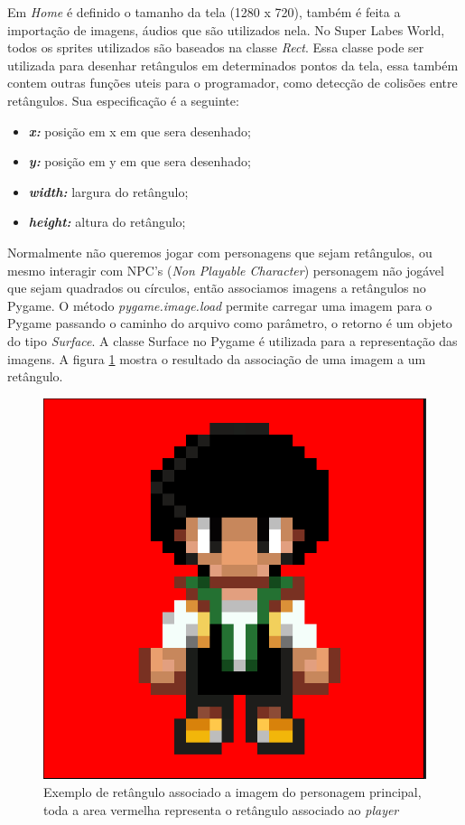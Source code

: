 
\clearpage
Em \textit{Home} é definido o tamanho da tela (1280 x 720), também é feita a importação de imagens, áudios que são utilizados nela.
No Super Labes World, todos os sprites utilizados são  baseados na classe \textit{Rect}. Essa classe pode ser utilizada para desenhar retângulos em determinados pontos da tela, essa também contem outras funções uteis para o programador, como detecção de colisões entre retângulos. Sua especificação é a seguinte:
\begin{itemize}
    \item \textit{\textbf{x:}} posição em x em que sera desenhado;
    \item \textit{\textbf{y:}} posição em y em que sera desenhado;
    \item \textit{\textbf{width:}} largura do retângulo;
    \item \textit{\textbf{height:}} altura do retângulo;
\end{itemize}

Normalmente não queremos jogar com personagens que sejam retângulos, ou mesmo interagir com NPC's (\textit{Non Playable Character}) personagem não jogável que sejam quadrados ou círculos, então associamos imagens a retângulos no Pygame. O método \textit{pygame.image.load} permite carregar uma imagem para o Pygame passando o caminho do arquivo como parâmetro, o retorno é um objeto do tipo \textit{Surface}. A classe Surface no Pygame é utilizada  para a representação das imagens. A figura \ref{fig:player} mostra o resultado da associação de uma imagem a um retângulo.
\begin{figure}[h!]
    \centering
    \includegraphics[width=0.5\linewidth]{figuras/player.png}
    \caption{Exemplo de retângulo associado a imagem do personagem principal, toda a area vermelha representa o retângulo associado ao \textit{player}}
    \label{fig:player}
\end{figure}

